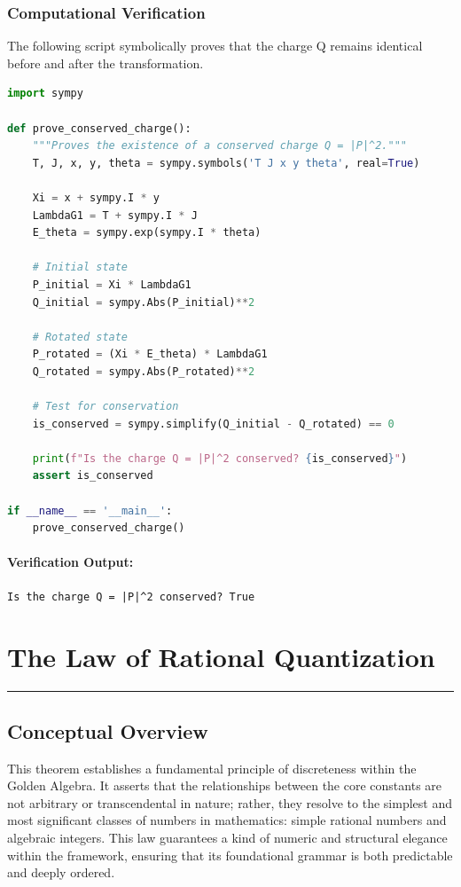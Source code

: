 \subsubsection*{Computational Verification}
The following script symbolically proves that the charge Q remains identical before and after the transformation.
\begin{lstlisting}[language=Python, caption={Symbolic proof of a conserved Noether charge.}]
import sympy

def prove_conserved_charge():
    """Proves the existence of a conserved charge Q = |P|^2."""
    T, J, x, y, theta = sympy.symbols('T J x y theta', real=True)
    
    Xi = x + sympy.I * y
    LambdaG1 = T + sympy.I * J
    E_theta = sympy.exp(sympy.I * theta)
    
    # Initial state
    P_initial = Xi * LambdaG1
    Q_initial = sympy.Abs(P_initial)**2
    
    # Rotated state
    P_rotated = (Xi * E_theta) * LambdaG1
    Q_rotated = sympy.Abs(P_rotated)**2
    
    # Test for conservation
    is_conserved = sympy.simplify(Q_initial - Q_rotated) == 0
    
    print(f"Is the charge Q = |P|^2 conserved? {is_conserved}")
    assert is_conserved

if __name__ == '__main__':
    prove_conserved_charge()
\end{lstlisting}
\paragraph{Verification Output:}
\begin{verbatim}
Is the charge Q = |P|^2 conserved? True
\end{verbatim}


\section{The Law of Rational Quantization}
\label{sec:rational_quantization}
\hrule
\vspace{1em}


\subsection{Conceptual Overview}
This theorem establishes a fundamental principle of discreteness within the Golden Algebra. It asserts that the relationships between the core constants are not arbitrary or transcendental in nature; rather, they resolve to the simplest and most significant classes of numbers in mathematics: simple rational numbers and algebraic integers. This law guarantees a kind of numeric and structural elegance within the framework, ensuring that its foundational grammar is both predictable and deeply ordered.


